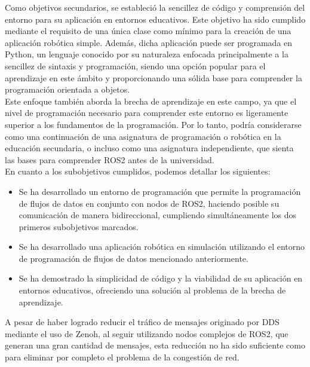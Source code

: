 Como objetivos secundarios, se estableció la sencillez de código y comprensión
del entorno para su aplicación en entornos educativos.
Este objetivo ha sido cumplido mediante el requisito de una única clase como
mínimo para la creación de una aplicación robótica simple.
Además, dicha aplicación puede ser programada en Python, un lenguaje conocido
por su naturaleza enfocada principalmente a la sencillez de sintaxis y
programación, siendo una opción popular para el aprendizaje en este ámbito y
proporcionando una sólida base para comprender la programación orientada a
objetos.
\\

Este enfoque también aborda la brecha de aprendizaje en este campo, ya que el
nivel de programación necesario para comprender este entorno es ligeramente
superior a los fundamentos de la programación.
Por lo tanto, podría considerarse como una continuación de una asignatura de
programación o robótica en la educación secundaria, o incluso como una
asignatura independiente, que sienta las bases para comprender ROS2 antes de la
universidad.
\\

En cuanto a los subobjetivos cumplidos, podemos detallar los siguientes:

\begin{itemize}
    \item{Se ha desarrollado un entorno de programación que permite la
        programación de flujos de datos en conjunto con nodos de ROS2, haciendo
        posible su comunicación de manera bidireccional, cumpliendo
        simultáneamente los dos primeros subobjetivos marcados.}
    \item{Se ha desarrollado una aplicación robótica en simulación utilizando el
        entorno de programación de flujos de datos mencionado anteriormente.}
    \item{Se ha demostrado la simplicidad de código y la viabilidad de su
        aplicación en entornos educativos, ofreciendo una solución al problema
        de la brecha de aprendizaje.}
\end{itemize}

A pesar de haber logrado reducir el tráfico de mensajes originado por DDS
mediante el uso de Zenoh, al seguir utilizando nodos complejos de ROS2, que
generan una gran cantidad de mensajes, esta reducción no ha sido suficiente como
para eliminar por completo el problema de la congestión de red.
\\

